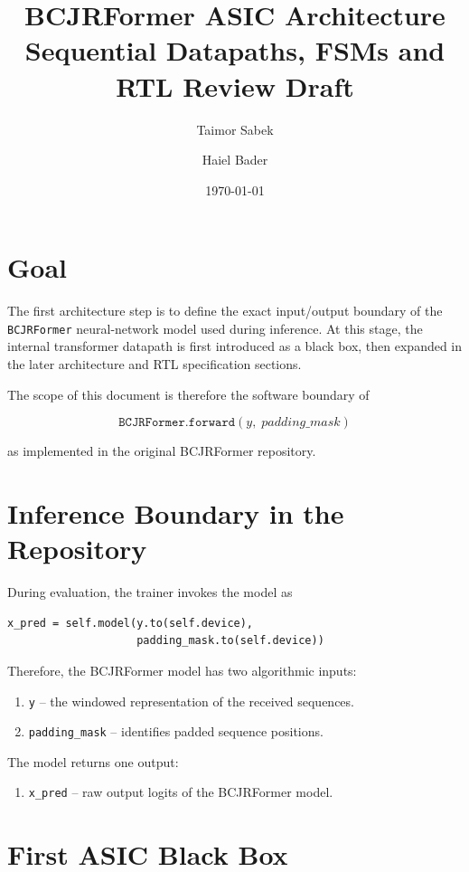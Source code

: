 \documentclass[11pt,a4paper]{article}
\title{\textbf{BCJRFormer ASIC Architecture}\\
\large Sequential Datapaths, FSMs and RTL Review Draft}
\author{Taimor Sabek \and Haiel Bader}
\date{\today}
\begin{document}
\maketitle

\section{Goal}

The first architecture step is to define the exact input/output boundary of the
\texttt{BCJRFormer} neural-network model used during inference. At this stage,
the internal transformer datapath is first introduced as a black box, then
expanded in the later architecture and RTL specification sections.

The scope of this document is therefore the software boundary of

\[
\texttt{BCJRFormer.forward}(y,\;padding\_mask)
\]

as implemented in the original BCJRFormer repository.

\section{Inference Boundary in the Repository}

During evaluation, the trainer invokes the model as

\begin{verbatim}
x_pred = self.model(y.to(self.device),
                    padding_mask.to(self.device))
\end{verbatim}

Therefore, the BCJRFormer model has two algorithmic inputs:

\begin{enumerate}[label=\arabic*.]
    \item \texttt{y} -- the windowed representation of the received sequences.
    \item \texttt{padding\_mask} -- identifies padded sequence positions.
\end{enumerate}

The model returns one output:

\begin{enumerate}[label=\arabic*.]
    \item \texttt{x\_pred} -- raw output logits of the BCJRFormer model.
\end{enumerate}

\section{First ASIC Black Box}
\end{document}
